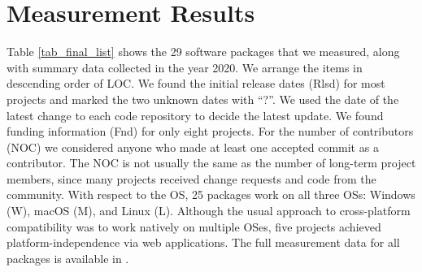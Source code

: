 \documentclass[final, 3p, times, authoryear]{elsarticle}
\begin{document}
\section{Measurement Results} \label{ch_results}

Table \ref{tab_final_list} shows the 29 software packages that we measured,
along with summary data collected in the year 2020. We arrange the items in
descending order of LOC. We found the initial release dates (Rlsd) for most
projects and marked the two unknown dates with ``?''. We used the date of the
latest change to each code repository to decide the latest update. We found
funding information (Fnd) for only eight projects.  For the number of
contributors (NOC) we considered anyone who made at least one accepted commit as
a contributor. The NOC is not usually the same as the number of long-term
project members, since many projects received change requests and code from the
community.  With respect to the OS, 25 packages work on all three OSs: Windows
(W), macOS (M), and Linux (L). Although the usual approach to cross-platform
compatibility was to work natively on multiple OSes, five projects achieved
platform-independence via web applications. The full measurement data for all
packages is available in \citet{Dong2021-Data}.
\end{document}
